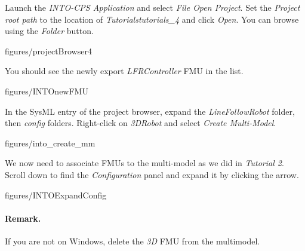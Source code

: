 \documentclass[11pt,a4paper]{../tutorial}
\begin{document}
\begin{instructions}
\item Launch the \emph{INTO-CPS Application} and select \emph{File \menusep Open Project}. Set the \emph{Project root path} to the location of \emph{Tutorials\pathsep{}tutorials\_4} and click \emph{Open}. You can browse using the \emph{Folder} button.

    \begin{annotation}[width=0.35\linewidth,trim=0 0 0 0,clip]{figures/projectBrowser4}
    \end{annotation}

    You should see the newly export \emph{LFRController} FMU in the list.

    \begin{annotation}[height=0.5\linewidth,trim=0 125 250 0,clip]{figures/INTOnewFMU}
    \end{annotation}

\item In the SysML entry of the project browser, expand the \emph{LineFollowRobot} folder, then \emph{config} folders. Right-click on \emph{3DRobot} and select \emph{Create Multi-Model}.

    \begin{annotation}[width=0.35\linewidth,trim=0 40 375 300,clip]{figures/into_create_mm}
    \end{annotation}

\newpage
\item We now need to associate FMUs to the multi-model as we did in \emph{Tutorial 2}. Scroll down to find the \emph{Configuration} panel and expand it by clicking the arrow.

    \begin{annotation}[width=0.85\linewidth,trim=0 0 0 250,clip]{figures/INTOExpandConfig}
    \end{annotation}

  \paragraph{Remark.} If you are not on Windows, delete the \emph{3D} FMU from the multimodel.


\end{instructions}
\end{document}
